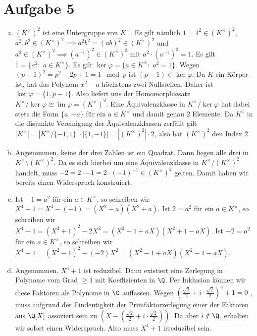 \documentclass{article}
\begin{document}
    \section*{Aufgabe 5}
    \begin{enumerate}[(a)]
        \item $(K^\times)^2$ ist eine Untergruppe von $K^\times$. Es gilt nämlich $1 = 1^2 \in (K^\times)^2$, $a^2, b^2\in (K^\times)^2 \implies a^2b^2 = (ab)^2 \in (K^\times)^2$ und $a^2 \in (K^\times)^2 \implies (a^{-1})^2 \in (K^\times)^2$ mit $a^2 \cdot (a^{-1})^2 = 1$. Es gilt $\overline{1} = \{a^2\colon\; a \in K^\times\}$. 
        Es gilt $\ker \varphi = \{a \in K^\times\colon\; a^2 = 1\}$. Wegen $(p-1)^2 = p^2 - 2p + 1 = 1 \mod p$ ist $(p-1)\in \ker \varphi$. Da $K$ ein Körper ist, hat das Polynom $x^2 - a$ höchstens zwei Nullstellen. Daher ist $\ker \varphi = \{1,p-1\}$. Also liefert uns der Homomorphiesatz $K^\times / \ker \varphi \cong \operatorname{im} \varphi = (K^\times)^2$. Eine Äquivalenzklasse in $K^\times / \ker \varphi$ hat dabei stets die Form $\{a,-a\}$ für ein $a\in K^\times$ und damit genau 2 Elemente. Da $K^x$ in die disjunkte Vereinigung der Äquivalenzklassen zerfällt gilt $|K^\times| = |K^\times / \{-1,1\}| \cdot |\{1,-1\}| = |(K^\times)^2| \cdot 2$, also hat $(K^\times)^2$ den Index 2.
        \item Angenommen, keine der drei Zahlen ist ein Quadrat. Dann liegen alle drei in $K^\times \setminus (K^\times)^2$. Da es sich hierbei um eine Äquivalenzklasse in $K^\times /(K^\times)^2$ handelt, muss $-2 = 2 \cdot -1 = 2 \cdot (-1)^{-1} \in (K^\times)^2$ gelten. Damit haben wir bereits einen Widerspruch konstruiert.
        \item Ist $-1 = a^2$ für ein $a \in K^\times$, so schreiben wir $X^4 + 1 = X^4 - (-1) = (X^2 - a)(X^2 + a)$.
        Ist $2 = a^2$ für ein $a \in K^\times$, so schreiben wir $X^4 + 1 = (X^2 + 1)^2 - 2X^2 = (X^2 + 1 + aX)(X^2 + 1 - aX)$.
        Ist $-2 = a^2$ für ein $a \in K^\times$, so schreiben wir $X^4 + 1 = (X^2 - 1)^2 - (-2)X^2 = (X^2 - 1 + aX)(X^2 - 1 - aX)$.
        \item Angenommen, $X^4 + 1$ ist reduzibel. Dann existiert eine Zerlegung in Polynome vom Grad $\geq 1$ mit Koeffizienten in $\Q$.
        Per Inklusion können wir diese Faktoren als Polynome in $\C$ auffassen. Wegen $(\frac{\sqrt{2}}{2} +i \cdot \frac{\sqrt{2}}{2})^4 + 1 = 0$ , muss aufgrund der Eindeutigkeit der Primfaktorzerlegung einer der Faktoren aus $\Q[X]$ assoziert sein zu $(X - (\frac{\sqrt{2}}{2} +i \cdot \frac{\sqrt{2}}{2}))$. Da aber $i \notin \Q$, erhalten wir sofort einen Widerspruch. Also muss $X^4 + 1$ irreduzibel sein.
    \end{enumerate}
\end{document}
